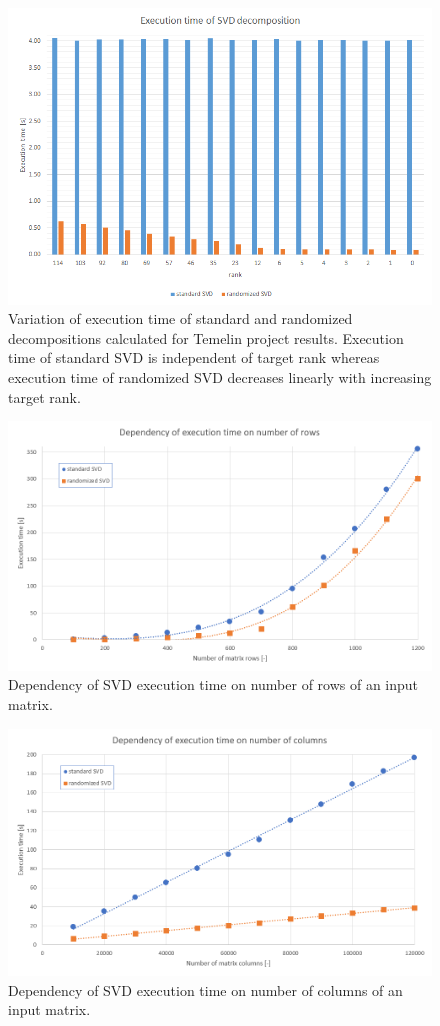 \begin{figure}[ht]
\centering\includegraphics[width=\textwidth]{figures/temelin_ExecutionTime}
\caption{Variation of execution time of standard and randomized decompositions calculated for Temelin project results. Execution time of standard SVD is independent of target rank whereas execution time of randomized SVD decreases linearly with increasing target rank.}
\label{fig:temelin:ExeTime}
\end{figure}

\begin{figure}[ht]
\centering\includegraphics[width=\textwidth]{figures/executionTime_varyingRows}
\caption{Dependency of SVD execution time on number of rows of an input matrix.}
\label{fig:ExeTime_rows}
\end{figure}

\begin{figure}[ht]
\centering\includegraphics[width=\textwidth]{figures/executionTime_varyingColumns}
\caption{Dependency of SVD execution time on number of columns of an input matrix.}
\label{fig:ExeTime_columns}
\end{figure}